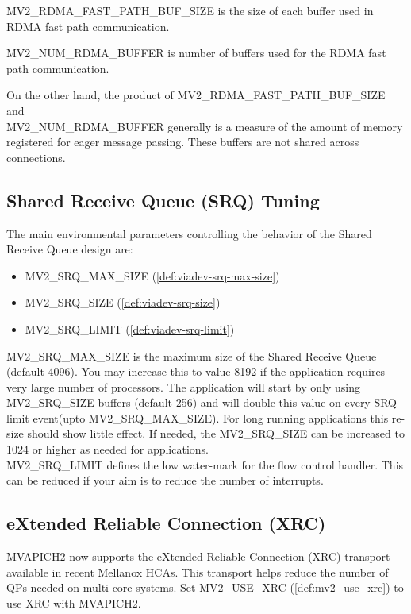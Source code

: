 MV2\_RDMA\_FAST\_PATH\_BUF\_SIZE is the size of each buffer used in RDMA fast path 
communication.

MV2\_NUM\_RDMA\_BUFFER is number of buffers used for the RDMA fast path communication.

On the other hand, the product of MV2\_RDMA\_FAST\_PATH\_BUF\_SIZE and \\
MV2\_NUM\_RDMA\_BUFFER generally is a measure of the amount of memory registered
for eager message passing. These buffers are not shared across connections.

\subsection{Shared Receive Queue (SRQ) Tuning}

The main environmental parameters controlling the behavior of the Shared
Receive Queue design are:

\begin{itemize}
    \item MV2\_SRQ\_MAX\_SIZE
        (\ref{def:viadev-srq-max-size})
    \item MV2\_SRQ\_SIZE
        (\ref{def:viadev-srq-size})
    \item MV2\_SRQ\_LIMIT
        (\ref{def:viadev-srq-limit})
\end{itemize}

MV2\_SRQ\_MAX\_SIZE is the maximum size of the Shared Receive Queue (default 4096).
You may increase this to value 8192 if the application requires very large number 
of processors. The application will start by only using MV2\_SRQ\_SIZE buffers 
(default 256) and will double this value on every SRQ limit event(upto MV2\_SRQ\_MAX\_SIZE).
For long running applications this re-size should show little effect. If needed, the MV2\_SRQ\_SIZE
can be increased to 1024 or higher as needed for applications. \\
MV2\_SRQ\_LIMIT defines the low water-mark for the
flow control handler. This can be reduced if your aim is to reduce the number of
interrupts.

\subsection {eXtended Reliable Connection (XRC)}

MVAPICH2 now supports the eXtended Reliable Connection (XRC) transport
available in recent Mellanox HCAs. This transport helps reduce the number of
QPs needed on multi-core systems. Set MV2\_USE\_XRC (\ref{def:mv2_use_xrc})
to use XRC with MVAPICH2.


